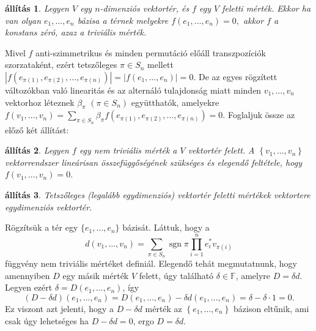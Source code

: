 \documentclass[a4paper, showtrims]{memoir}
\makeatletter
\renewenvironment{proof}[1][\proofname]
    {\par\pushQED{\qed}%
    \normalfont \topsep6\p@\@plus6\p@\relax
    \trivlist
    \item[\hskip\labelsep
        \itshape
    #1\@addpunct{:}]\ignorespaces}
    {\popQED\endtrivlist\@endpefalse}
\theoremstyle{plain}
\newtheorem{proposition}{állítás}[chapter]
\theoremstyle{remark}
\theoremstyle{definition}
\DeclareMathOperator{\sgn}{sgn}
\makeatother
\begin{document}
\begin{proposition}
	Legyen $V$ egy $n$-dimenziós vektortér, és $f$ egy $V$ feletti mérték.
	Ekkor ha van olyan $e_{1},\ldots ,e_{n}$ bázisa a térnek melyekre
	\(
	f\left( e_{1},\ldots ,e_{n}\right)
	=
	0,
	\)
	akkor $f$ a konstans zéró, azaz a triviális mérték.
\end{proposition}
\begin{proof}
	Mivel $f$ anti-szimmetrikus és minden permutáció előáll transzpozíciók szorzataként,
	ezért tetszőleges $\pi \in S_{n}$ mellett
	$\left| f\left(e_{\pi \left( 1\right) },e_{\pi \left( 2\right) },\ldots ,e_{\pi \left(n\right) }\right) \right|
		=
		\left| f\left( e_{1},\ldots ,e_{n}\right) \right|
		=
		0.
	$
	De az egyes rögzített változókban való linearitás és az alternáló tulajdonság miatt minden
	$v_{1},\ldots ,v_{n}$ vektorhoz léteznek
	$\beta _{\pi }$ $\left( \pi \in S_{n}\right) $ együtthatók,
	amelyekre
	$f\left(v_{1},\ldots ,v_{n}\right)
		=
		\sum_{\pi \in S_{n}}\beta _{\pi }f\left( e_{\pi\left( 1\right) },e_{\pi \left( 2\right) },\ldots ,e_{\pi \left( n\right)}\right)
		=
		0.$
\end{proof}
Foglaljuk össze az előző két állítást:
\begin{proposition}
	Legyen $f$ egy nem triviális mérték a $V$ vektortér felett. A
	\begin{math}
		\left\{ v_1,\ldots,v_n \right\}
	\end{math}
	vektorrendszer lineárisan összefüggőségének szükséges és elegendő feltétele,
	hogy
	\begin{math}
		f\left( v_1,\ldots,v_n \right)
		=
		0.
	\end{math}
\end{proposition}

\begin{proposition}
	Tetszőleges (legalább egydimenziós) vektortér feletti mértékek vektortere egydimenziós vektortér.
\end{proposition}
\begin{proof}
	Rögzítsük a tér egy $\{e_{1},\ldots ,e_{n}\}$ bázisát.
	Láttuk, hogy a
	\[
		d\left(v_{1},\ldots ,v_{n}\right)
		=
		\sum_{\pi \in S_{n}}\sgn\pi\prod_{i=1}^ne_i^\ast v_{\pi\left( i\right)}
	\]
	függvény nem triviális mértéket definiál.
	Elegendő tehát megmutatnunk,
	hogy amennyiben $D$ egy másik mérték $V$ felett,
	úgy található
	$\delta\in \mathbb{F}$,
	amelyre
	$D=\delta d.$
	Legyen ezért
	$\delta
		=
		D\left( e_{1},\ldots,e_{n}\right)
	$,
	így
	\[
		\left( D-\delta d \right)\left( e_1,\ldots,e_n \right)
		=
		D\left( e_{1},\ldots ,e_{n}\right) -\delta d\left(e_{1},\ldots ,e_{n}\right)
		=
		\delta-\delta\cdot 1
		=
		0.
	\]
	Ez viszont azt jelenti,
	hogy a $D-\delta d$ mérték az  $\left\{e_{1},\ldots ,e_{n}  \right\}$
	bázison eltűnik,
	ami csak úgy lehetséges ha
	$D-\delta d=0$,
	ergo
	\begin{math}
		D=\delta d.
	\end{math}
\end{proof}
\end{document}

